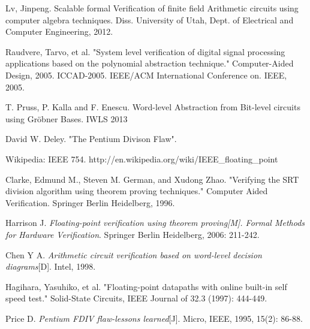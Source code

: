 \documentclass[11pt,twoside, onecolumn]{IEEEtran}
\begin{document}
\begin{thebibliography}{1}

Lv, Jinpeng. Scalable formal Verification of finite field Arithmetic circuits using
computer algebra techniques. Diss. University of Utah, 
Dept. of Electrical and Computer Engineering, 2012.

Raudvere, Tarvo, et al. "System level verification of digital signal processing applications based on the polynomial abstraction technique." Computer-Aided Design, 2005. ICCAD-2005. IEEE/ACM International Conference on. IEEE, 2005.

T. Pruss, P. Kalla and F. Enescu. Word-level Abstraction from Bit-level circuits using Gr\"obner Bases. IWLS 2013



David W. Deley. "The Pentium Divison Flaw". 


Wikipedia: IEEE 754. http://en.wikipedia.org/wiki/IEEE\_floating\_point


Clarke, Edmund M., Steven M. German, and Xudong Zhao. "Verifying the SRT division algorithm using theorem proving techniques." Computer Aided Verification. Springer Berlin Heidelberg, 1996.

Harrison J. \emph{Floating-point verification using theorem proving[M]. Formal Methods for Hardware Verification}. Springer Berlin Heidelberg, 2006: 211-242.


Chen Y A. \emph{Arithmetic circuit verification based on word-level decision diagrams}[D]. Intel, 1998.


Hagihara, Yasuhiko, et al. "Floating-point datapaths with online built-in self speed test." Solid-State Circuits, IEEE Journal of 32.3 (1997): 444-449.


Price D. \emph{Pentium FDIV flaw-lessons learned}[J]. Micro, IEEE, 1995, 15(2): 86-88.

\end{thebibliography}
\end{document}
